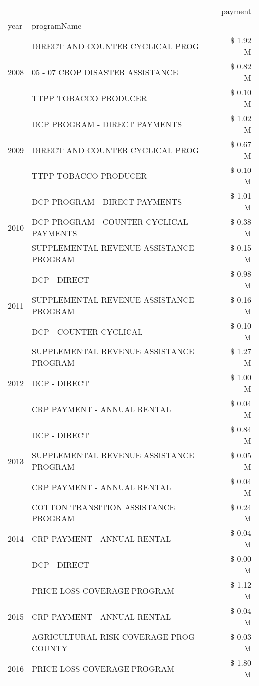 \begin{tabular}{llr}
\toprule
 &  & payment \\
year & programName &  \\
\midrule
\multirow[t]{3}{*}{2008} & DIRECT AND COUNTER CYCLICAL PROG & \$ 1.92 M \\
 & 05 - 07 CROP DISASTER ASSISTANCE & \$ 0.82 M \\
 & TTPP TOBACCO PRODUCER & \$ 0.10 M \\
\cline{1-3}
\multirow[t]{3}{*}{2009} & DCP PROGRAM - DIRECT PAYMENTS & \$ 1.02 M \\
 & DIRECT AND COUNTER CYCLICAL PROG & \$ 0.67 M \\
 & TTPP TOBACCO PRODUCER & \$ 0.10 M \\
\cline{1-3}
\multirow[t]{3}{*}{2010} & DCP PROGRAM - DIRECT PAYMENTS & \$ 1.01 M \\
 & DCP PROGRAM - COUNTER CYCLICAL PAYMENTS & \$ 0.38 M \\
 & SUPPLEMENTAL REVENUE ASSISTANCE PROGRAM & \$ 0.15 M \\
\cline{1-3}
\multirow[t]{3}{*}{2011} & DCP - DIRECT & \$ 0.98 M \\
 & SUPPLEMENTAL REVENUE ASSISTANCE PROGRAM & \$ 0.16 M \\
 & DCP - COUNTER CYCLICAL & \$ 0.10 M \\
\cline{1-3}
\multirow[t]{3}{*}{2012} & SUPPLEMENTAL REVENUE ASSISTANCE PROGRAM & \$ 1.27 M \\
 & DCP - DIRECT & \$ 1.00 M \\
 & CRP PAYMENT - ANNUAL RENTAL & \$ 0.04 M \\
\cline{1-3}
\multirow[t]{3}{*}{2013} & DCP - DIRECT & \$ 0.84 M \\
 & SUPPLEMENTAL REVENUE ASSISTANCE PROGRAM & \$ 0.05 M \\
 & CRP PAYMENT - ANNUAL RENTAL & \$ 0.04 M \\
\cline{1-3}
\multirow[t]{3}{*}{2014} & COTTON TRANSITION ASSISTANCE PROGRAM & \$ 0.24 M \\
 & CRP PAYMENT - ANNUAL RENTAL & \$ 0.04 M \\
 & DCP - DIRECT & \$ 0.00 M \\
\cline{1-3}
\multirow[t]{3}{*}{2015} & PRICE LOSS COVERAGE PROGRAM & \$ 1.12 M \\
 & CRP PAYMENT - ANNUAL RENTAL & \$ 0.04 M \\
 & AGRICULTURAL RISK COVERAGE PROG - COUNTY & \$ 0.03 M \\
\cline{1-3}
\multirow[t]{3}{*}{2016} & PRICE LOSS COVERAGE PROGRAM & \$ 1.80 M \\

\end{tabular}
